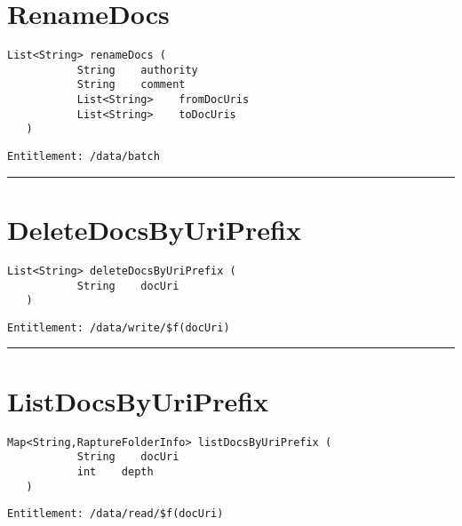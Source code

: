 \section{RenameDocs}
\label{Api:RenameDocs}
\begin{lstlisting}[style=nonumbers]
   List<String> renameDocs (
           String    authority
           String    comment
           List<String>    fromDocUris
           List<String>    toDocUris
   )
\end{lstlisting}
\begin{Verbatim}[formatcom=\color{Maroon}]
  Entitlement: /data/batch
\end{Verbatim}



\rule{12cm}{2pt}
\section{DeleteDocsByUriPrefix}
\label{Api:DeleteDocsByUriPrefix}
\begin{lstlisting}[style=nonumbers]
   List<String> deleteDocsByUriPrefix (
           String    docUri
   )
\end{lstlisting}
\begin{Verbatim}[formatcom=\color{Maroon}]
  Entitlement: /data/write/$f(docUri)
\end{Verbatim}



\rule{12cm}{2pt}
\section{ListDocsByUriPrefix}
\label{Api:ListDocsByUriPrefix}
\begin{lstlisting}[style=nonumbers]
   Map<String,RaptureFolderInfo> listDocsByUriPrefix (
           String    docUri
           int    depth
   )
\end{lstlisting}
\begin{Verbatim}[formatcom=\color{Maroon}]
  Entitlement: /data/read/$f(docUri)
\end{Verbatim}



